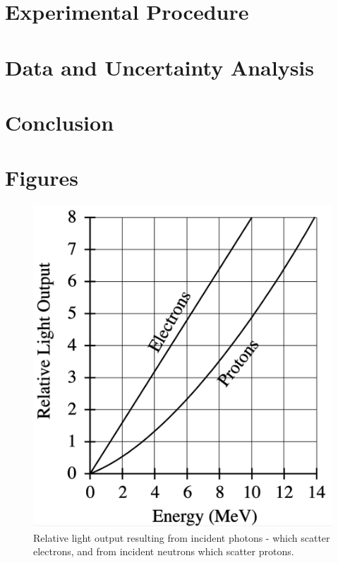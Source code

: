\documentclass{article}
\begin{document}
\section{Experimental Procedure}

\section{Data and Uncertainty Analysis}

\section{Conclusion}

\section{Figures}
  \begin{figure}[!htb]
    \centering
    \includegraphics[scale=.5]{relative_response.png}
    \caption{Relative light output resulting from incident photons - which scatter electrons, and from incident neutrons which scatter protons.}
    \label{response}
  \end{figure}

  \hspace{.25cm}
\end{document}
